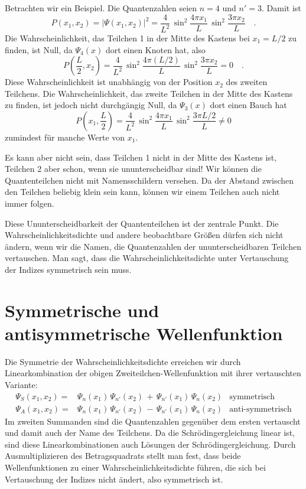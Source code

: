 Betrachten wir ein Beispiel. Die Quantenzahlen seien $n = 4$ und $n' = 3$. Damit ist 
\begin{equation}
    P(x_1, x_2) = |  \Psi(x_1, x_2)|^2 = \frac{4}{L^2} \, \sin^2 \frac{4 \pi x_1}{L} \, \sin^2 \frac{3 \pi x_2}{L} \quad .
\end{equation}
Die Wahrscheinlichkeit, das Teilchen 1 in der Mitte des Kastens bei $x_1 = L/2$ zu finden, ist Null, da $\Psi_4(x)$ dort einen Knoten hat, also 
\begin{equation}
    P\left(\frac{L}{2}, x_2\right) = \frac{4}{L^2} \, \sin^2 \frac{4 \pi (L/2)}{L} \, \sin^2 \frac{3 \pi x_2}{L}  = 0 \quad .
\end{equation}
Diese Wahrscheinlichkeit ist unabhängig von der Position $x_2$ des zweiten Teilchens. Die Wahrscheinlichkeit, das zweite Teilchen in der Mitte des Kastens zu finden, ist jedoch nicht durchgängig Null, da $\Psi_3(x)$ dort einen Bauch hat
\begin{equation}
    P\left(x_1, \frac{L}{2}\right) = \frac{4}{L^2} \, \sin^2 \frac{4 \pi x_1}{L} \, \sin^2 \frac{3 \pi L/2}{L}  \neq 0
\end{equation}
zumindest für manche Werte von $x_1$.


Es kann aber nicht sein, dass Teilchen 1 nicht in der Mitte des Kastens ist, Teilchen 2 aber schon, wenn sie ununterscheidbar sind! Wir können die Quantenteilchen nicht mit Namensschildern versehen. Da der Abstand zwischen den Teilchen beliebig klein sein kann, können wir einem Teilchen auch nicht immer folgen.

Diese Ununterscheidbarkeit der Quantenteilchen ist der zentrale Punkt. Die Wahrscheinlichkeitsdichte und andere beobachtbare Größen dürfen sich nicht ändern, wenn wir die Namen, die Quantenzahlen der ununterscheidbaren Teilchen vertauschen. Man sagt, dass die Wahrscheinlichkeitsdichte unter Vertauschung der Indizes symmetrisch sein muss.

\section{Symmetrische und antisymmetrische Wellenfunktion}

Die Symmetrie der Wahrscheinlichkeitsdichte erreichen wir durch Linearkombination der obigen Zweiteilchen-Wellenfunktion mit ihrer vertauschten Variante:
\begin{align}
    \Psi_S(x_1, x_2) = & \Psi_{n}(x_1) \, \Psi_{n'}(x_2) \, + \, \Psi_{n'}(x_1) \, \Psi_{n}(x_2) & \text{symmetrisch}
    \label{eq:6_sym_WF} \\
    \Psi_A(x_1, x_2) = & \Psi_{n}(x_1) \, \Psi_{n'}(x_2) \, - \, \Psi_{n'}(x_1) \, \Psi_{n}(x_2) & \text{anti-symmetrisch} 
    \label{eq:6_asym_WF} 
\end{align}
Im zweiten Summanden sind die Quantenzahlen gegenüber dem ersten vertauscht und damit auch der Name des Teilchens. Da die Schrödingergleichung linear ist, sind diese Linearkombinationen auch Lösungen der Schrödingergleichung.
Durch Ausmultiplizieren des Betragsquadrats stellt man fest, dass beide Wellenfunktionen zu einer Wahrscheinlichkeitsdichte führen, die sich bei Vertauschung der Indizes nicht ändert, also symmetrisch ist.


